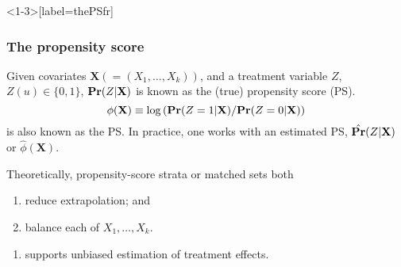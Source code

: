 \begin{frame}<1-3>[label=thePSfr]
  \frametitle{The propensity score}

Given covariates $\mathbf{X} (=(X_1, \ldots, X_k))$, and a
treatment variable $Z$, $Z(u) \in \{0, 1\}$,  $\mathbf{Pr} (Z \vert \mathbf{X})$ is known as the (true) \alert<1>{propensity score} (PS).  
$$ \phi( \mathbf{X} ) \equiv \log\left( \mathbf{Pr} (Z=1 \vert \mathbf{X})/\mathbf{Pr} (Z=0 \vert \mathbf{X}) \right)$$
is also known as the PS.  In practice, one works
with an estimated PS, $\hat{\mathbf{Pr}} (Z \vert \mathbf{X})$ or
$\hat{\phi}(\mathbf{X})$.

Theoretically, propensity-score strata or matched sets both
\begin{enumerate}
 \item<2-| alert@+> reduce extrapolation; and
\item<3-| alert@+> balance each of $X_1, \ldots, X_k$.
\end{enumerate}

\begin{enumerate}
  \addtocounter{enumi}{2}
\item<5-| alert@+> supports unbiased estimation of treatment effects.
\end{enumerate}

\end{frame}



